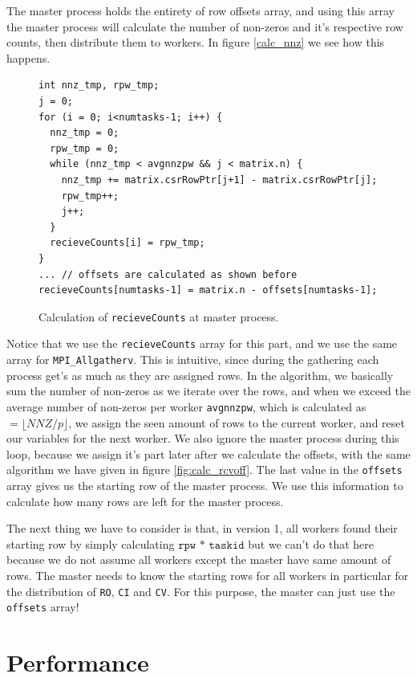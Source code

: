 \documentclass[12pt,reqno]{amsart}
\newcommand{\code}[1]{\texttt{#1}}
\begin{document}
The master process holds the entirety of row offsets array, and using this array the master process will calculate the number of non-zeros and it's respective row counts, then distribute them to workers. In figure \ref{calc_nnz} we see how this happens. 
\begin{figure}[h]
\centering
\begin{lstlisting}
int nnz_tmp, rpw_tmp;
j = 0;
for (i = 0; i<numtasks-1; i++) {
  nnz_tmp = 0;
  rpw_tmp = 0;
  while (nnz_tmp < avgnnzpw && j < matrix.n) {
    nnz_tmp += matrix.csrRowPtr[j+1] - matrix.csrRowPtr[j];
    rpw_tmp++;	
    j++;
  }
  recieveCounts[i] = rpw_tmp;		
}
... // offsets are calculated as shown before
recieveCounts[numtasks-1] = matrix.n - offsets[numtasks-1];
\end{lstlisting}
\caption{Calculation of \code{recieveCounts} at master process.}
\label{fig:calc_nnz}
\end{figure}
Notice that we use the \code{recieveCounts} array for this part, and we use the same array for \code{MPI\_Allgatherv}. This is intuitive, since during the gathering each process get's as much as they are assigned rows. In the algorithm, we basically sum the number of non-zeros as we iterate over the rows, and when we exceed the average number of non-zeros per worker \code{avgnnzpw}, which is calculated as $=\lfloor NNZ/p\rfloor$, we assign the seen amount of rows to the current worker, and reset our variables for the next worker. We also ignore the master process during this loop, because we assign it's part later after we calculate the offsets, with the same algorithm we have given in figure \ref{fig:calc_rcvoff}. The last value in the \code{offsets} array gives us the starting row of the master process. We use this information to calculate how many rows are left for the master process.

The next thing we have to consider is that, in version 1, all workers found their starting row by simply calculating $\code{rpw * taskid}$ but we can't do that here because we do not assume all workers except the master have same amount of rows. The master needs to know the starting rows for all workers in particular for the distribution of \code{RO}, \code{CI} and \code{CV}. For this purpose, the master can just use the \code{offsets} array!

\section{Performance}
\end{document}
